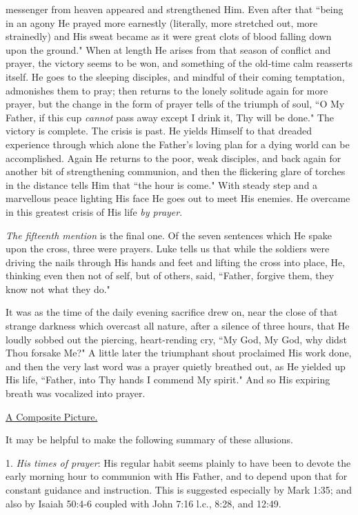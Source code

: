 messenger from heaven appeared and strengthened Him. Even after that
``being in an agony He prayed more earnestly (literally, more stretched
out, more strainedly) and His sweat became as it were great clots of blood
falling down upon the ground." When at length He arises from that season
of conflict and prayer, the victory seems to be won, and something of the
old-time calm reasserts itself. He goes to the sleeping disciples, and
mindful of their coming temptation, admonishes them to pray; then returns
to the lonely solitude again for more prayer, but the change in the form
of prayer tells of the triumph of soul, ``O My Father, if this cup
\textit{cannot} pass away except I drink it, Thy will be done." The victory is
complete. The crisis is past. He yields Himself to that dreaded experience
through which alone the Father's loving plan for a dying world can be
accomplished. Again He returns to the poor, weak disciples, and back again
for another bit of strengthening communion, and then the flickering glare
of torches in the distance tells Him that ``the hour is come." With steady
step and a marvellous peace lighting His face He goes out to meet His
enemies. He overcame in this greatest crisis of His life \textit{by prayer}.

\textit{The fifteenth mention} is the final one. Of the seven sentences which He
spake upon the cross, three were prayers. Luke tells us that while the
soldiers were driving the nails through His hands and feet and lifting the
cross into place, He, thinking even then not of self, but of others, said,
``Father, forgive them, they know not what they do."

It was as the time of the daily evening sacrifice drew on, near the close
of that strange darkness which overcast all nature, after a silence of
three hours, that He loudly sobbed out the piercing, heart-rending cry,
``My God, My God, why didst Thou forsake Me?" A little later the triumphant
shout proclaimed His work done, and then the very last word was a prayer
quietly breathed out, as He yielded up His life, ``Father, into Thy hands
I commend My spirit." And so His expiring breath was vocalized into
prayer.



\underline{A Composite Picture.}


It may be helpful to make the following summary of these allusions.

1. \textit{His times of prayer}: His regular habit seems plainly to have been to
devote the early morning hour to communion with His Father, and to depend
upon that for constant guidance and instruction. This is suggested
especially by Mark 1:35; and also by Isaiah 50:4-6 coupled with John 7:16
l.c., 8:28, and 12:49.

